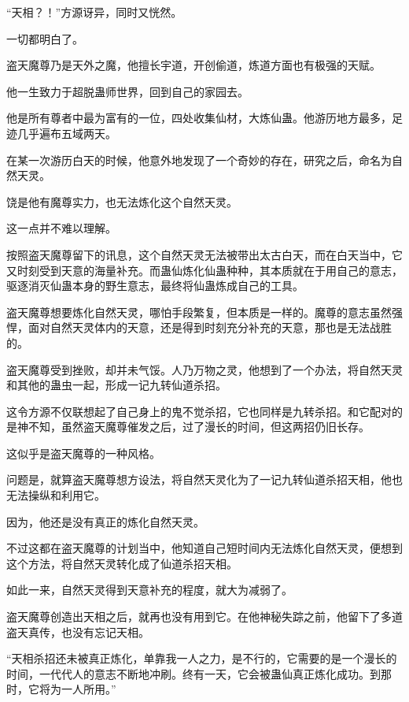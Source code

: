 
\begin{this_body}



“天相？！”方源讶异，同时又恍然。

一切都明白了。

盗天魔尊乃是天外之魔，他擅长宇道，开创偷道，炼道方面也有极强的天赋。

他一生致力于超脱蛊师世界，回到自己的家园去。

他是所有尊者中最为富有的一位，四处收集仙材，大炼仙蛊。他游历地方最多，足迹几乎遍布五域两天。

在某一次游历白天的时候，他意外地发现了一个奇妙的存在，研究之后，命名为自然天灵。

饶是他有魔尊实力，也无法炼化这个自然天灵。

这一点并不难以理解。

按照盗天魔尊留下的讯息，这个自然天灵无法被带出太古白天，而在白天当中，它又时刻受到天意的海量补充。而蛊仙炼化仙蛊种种，其本质就在于用自己的意志，驱逐消灭仙蛊本身的野生意志，最终将仙蛊炼成自己的工具。

盗天魔尊想要炼化自然天灵，哪怕手段繁复，但本质是一样的。魔尊的意志虽然强悍，面对自然天灵体内的天意，还是得到时刻充分补充的天意，那也是无法战胜的。

盗天魔尊受到挫败，却并未气馁。人乃万物之灵，他想到了一个办法，将自然天灵和其他的蛊虫一起，形成一记九转仙道杀招。

这令方源不仅联想起了自己身上的鬼不觉杀招，它也同样是九转杀招。和它配对的是神不知，虽然盗天魔尊催发之后，过了漫长的时间，但这两招仍旧长存。

这似乎是盗天魔尊的一种风格。

问题是，就算盗天魔尊想方设法，将自然天灵化为了一记九转仙道杀招天相，他也无法操纵和利用它。

因为，他还是没有真正的炼化自然天灵。

不过这都在盗天魔尊的计划当中，他知道自己短时间内无法炼化自然天灵，便想到这个方法，将自然天灵转化成了仙道杀招天相。

如此一来，自然天灵得到天意补充的程度，就大为减弱了。

盗天魔尊创造出天相之后，就再也没有用到它。在他神秘失踪之前，他留下了多道盗天真传，也没有忘记天相。

“天相杀招还未被真正炼化，单靠我一人之力，是不行的，它需要的是一个漫长的时间，一代代人的意志不断地冲刷。终有一天，它会被蛊仙真正炼化成功。到那时，它将为一人所用。”


\end{this_body}
